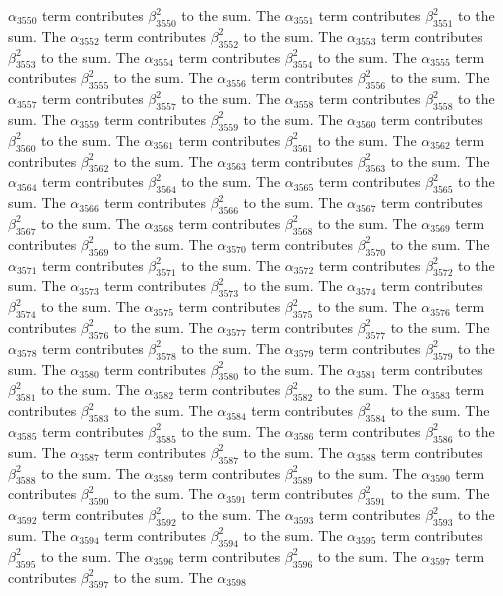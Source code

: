 \begin{lemma}
$\alpha_{3550}$ term contributes $\beta_{3550}^{2}$ to the sum. The $\alpha_{3551}$ term contributes $\beta_{3551}^{2}$ to the sum. The $\alpha_{3552}$ term contributes $\beta_{3552}^{2}$ to the sum. The $\alpha_{3553}$ term contributes $\beta_{3553}^{2}$ to the sum. The $\alpha_{3554}$ term contributes $\beta_{3554}^{2}$ to the sum. The $\alpha_{3555}$ term contributes $\beta_{3555}^{2}$ to the sum. The $\alpha_{3556}$ term contributes $\beta_{3556}^{2}$ to the sum. The $\alpha_{3557}$ term contributes $\beta_{3557}^{2}$ to the sum. The $\alpha_{3558}$ term contributes $\beta_{3558}^{2}$ to the sum. The $\alpha_{3559}$ term contributes $\beta_{3559}^{2}$ to the sum. The $\alpha_{3560}$ term contributes $\beta_{3560}^{2}$ to the sum. The $\alpha_{3561}$ term contributes $\beta_{3561}^{2}$ to the sum. The $\alpha_{3562}$ term contributes $\beta_{3562}^{2}$ to the sum. The $\alpha_{3563}$ term contributes $\beta_{3563}^{2}$ to the sum. The $\alpha_{3564}$ term contributes $\beta_{3564}^{2}$ to the sum. The $\alpha_{3565}$ term contributes $\beta_{3565}^{2}$ to the sum. The $\alpha_{3566}$ term contributes $\beta_{3566}^{2}$ to the sum. The $\alpha_{3567}$ term contributes $\beta_{3567}^{2}$ to the sum. The $\alpha_{3568}$ term contributes $\beta_{3568}^{2}$ to the sum. The $\alpha_{3569}$ term contributes $\beta_{3569}^{2}$ to the sum. The $\alpha_{3570}$ term contributes $\beta_{3570}^{2}$ to the sum. The $\alpha_{3571}$ term contributes $\beta_{3571}^{2}$ to the sum. The $\alpha_{3572}$ term contributes $\beta_{3572}^{2}$ to the sum. The $\alpha_{3573}$ term contributes $\beta_{3573}^{2}$ to the sum. The $\alpha_{3574}$ term contributes $\beta_{3574}^{2}$ to the sum. The $\alpha_{3575}$ term contributes $\beta_{3575}^{2}$ to the sum. The $\alpha_{3576}$ term contributes $\beta_{3576}^{2}$ to the sum. The $\alpha_{3577}$ term contributes $\beta_{3577}^{2}$ to the sum. The $\alpha_{3578}$ term contributes $\beta_{3578}^{2}$ to the sum. The $\alpha_{3579}$ term contributes $\beta_{3579}^{2}$ to the sum. The $\alpha_{3580}$ term contributes $\beta_{3580}^{2}$ to the sum. The $\alpha_{3581}$ term contributes $\beta_{3581}^{2}$ to the sum. The $\alpha_{3582}$ term contributes $\beta_{3582}^{2}$ to the sum. The $\alpha_{3583}$ term contributes $\beta_{3583}^{2}$ to the sum. The $\alpha_{3584}$ term contributes $\beta_{3584}^{2}$ to the sum. The $\alpha_{3585}$ term contributes $\beta_{3585}^{2}$ to the sum. The $\alpha_{3586}$ term contributes $\beta_{3586}^{2}$ to the sum. The $\alpha_{3587}$ term contributes $\beta_{3587}^{2}$ to the sum. The $\alpha_{3588}$ term contributes $\beta_{3588}^{2}$ to the sum. The $\alpha_{3589}$ term contributes $\beta_{3589}^{2}$ to the sum. The $\alpha_{3590}$ term contributes $\beta_{3590}^{2}$ to the sum. The $\alpha_{3591}$ term contributes $\beta_{3591}^{2}$ to the sum. The $\alpha_{3592}$ term contributes $\beta_{3592}^{2}$ to the sum. The $\alpha_{3593}$ term contributes $\beta_{3593}^{2}$ to the sum. The $\alpha_{3594}$ term contributes $\beta_{3594}^{2}$ to the sum. The $\alpha_{3595}$ term contributes $\beta_{3595}^{2}$ to the sum. The $\alpha_{3596}$ term contributes $\beta_{3596}^{2}$ to the sum. The $\alpha_{3597}$ term contributes $\beta_{3597}^{2}$ to the sum. The $\alpha_{3598}$ 
\end{lemma}
